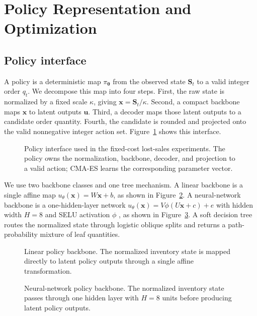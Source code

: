 \documentclass[authoryear,11pt]{elsarticle}
\newcommand{\btheta}{\boldsymbol{\theta}}
\begin{document}
\section{Policy Representation and Optimization}
\label{sec:policy_representation}

\subsection{Policy interface}

A policy is a deterministic map $\pi_{\btheta}$ from the observed state $\mathbf S_t$ to a valid integer order $q_t$. We decompose this map into four steps. First, the raw state is normalized by a fixed scale $\kappa$, giving $\mathbf x=\mathbf S_t/\kappa$. Second, a compact backbone maps $\mathbf x$ to latent outputs $\mathbf u$. Third, a decoder maps those latent outputs to a candidate order quantity. Fourth, the candidate is rounded and projected onto the valid nonnegative integer action set. Figure~\ref{fig:policy_pipeline} shows this interface.

\begin{figure}[H]
\centering
\PolicyPipelineFigure
\caption{Policy interface used in the fixed-cost lost-sales experiments. The policy owns the normalization, backbone, decoder, and projection to a valid action; CMA-ES learns the corresponding parameter vector.}
\label{fig:policy_pipeline}
\end{figure}

We use two backbone classes and one tree mechanism. A linear backbone is a single affine map $u_\theta(\mathbf x)=W\mathbf x+b$, as shown in Figure~\ref{fig:linear_policy}. A neural-network backbone is a one-hidden-layer network $u_\theta(\mathbf x)=V\phi(U\mathbf x+c)+e$ with hidden width $H=8$ and SELU activation $\phi$ \citep{Klambauer2017Self}, as shown in Figure~\ref{fig:neural_policy}. A soft decision tree routes the normalized state through logistic oblique splits and returns a path-probability mixture of leaf quantities.

\begin{figure}[H]
\centering
\LinearPolicyFigure
\caption{Linear policy backbone. The normalized inventory state is mapped directly to latent policy outputs through a single affine transformation.}
\label{fig:linear_policy}
\end{figure}

\begin{figure}[H]
\centering
\NeuralPolicyFigure
\caption{Neural-network policy backbone. The normalized inventory state passes through one hidden layer with $H=8$ units before producing latent policy outputs.}
\label{fig:neural_policy}
\end{figure}
\end{document}
